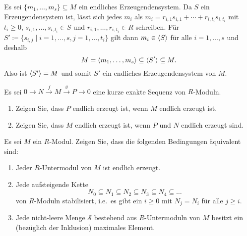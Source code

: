 \begin{solution}
  Es sei $\{m_1, \dotsc, m_s\} \subseteq M$ ein endliches Erzeugendensystem.
  Da $S$ ein Erzeugendensystem ist, lässt sich jedes $m_i$ als $m_i = r_{i,1} s_{i,1} + \dotsb + r_{i,t_i} s_{i,t_i}$ mit $t_i \geq 0$, $s_{i,1}, \dotsc, s_{i,t_i} \in S$ und $r_{i,1}, \dotsc, r_{i,t_i} \in R$ schreiben.
  Für $S' \coloneqq \{s_{i,j} \mid i = 1, \dotsc, s, j = 1, \dotsc, t_i\}$ gilt dann $m_i \in \left\langle S \right\rangle$ für alle $i = 1, \dotsc, s$ und deshalb
  \[
              M
    =         \left\langle m_1, \dotsc, m_s \right\rangle
    \subseteq \left\langle S' \right\rangle
    \subseteq M.
  \]
  Also ist $\left\langle S' \right\rangle = M$ und somit $S'$ ein endliches Erzeugendensystem von $M$.
\end{solution}


\begin{question}
  Es sei $0 \to N \xrightarrow{f} M \xrightarrow{g} P \to 0$ eine kurze exakte Sequenz von $R$-Moduln.
  \begin{enumerate}
    \item
      Zeigen Sie, dass $P$ endlich erzeugt ist, wenn $M$ endlich erzeugt ist.
    \item
      Zeigen Sie, dass $M$ endlich erzeugt ist, wenn $P$ und $N$ endlich erzeugt sind.
  \end{enumerate}
\end{question}





\begin{question}[subtitle=Charakterisierungen noetherscher Moduln]
  Es sei $M$ ein $R$-Modul.
  Zeigen Sie, dass die folgenden Bedingungen äquivalent sind:
  \begin{enumerate}
    \item
      Jeder $R$-Untermodul von $M$ ist endlich erzeugt.
    \item
      Jede aufsteigende Kette
      \[
        N_0 \subseteq N_1 \subseteq N_2 \subseteq N_3 \subseteq N_4 \subseteq \dotso
      \]
      von $R$-Moduln stabilisiert, i.e.\ es gibt ein $i \geq 0$ mit $N_j = N_i$ für alle $j \geq i$.
    \item
      Jede nicht-leere Menge $\mathcal{S}$ bestehend aus $R$-Untermoduln von $M$ besitzt ein (bezüglich der Inklusion) maximales Element.
  \end{enumerate}
\end{question}




